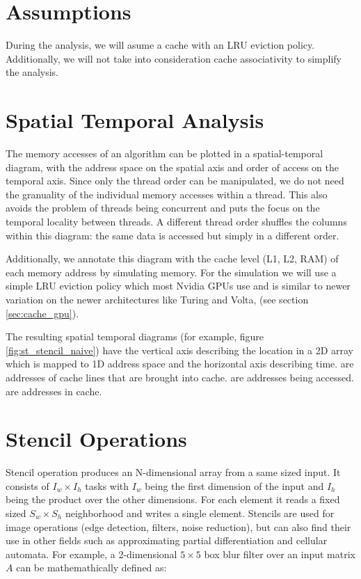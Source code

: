 \section{Assumptions}
During the analysis, we will asume a cache with an LRU eviction policy.
Additionally, we will not take into consideration cache associativity to simplify the analysis.

\section{Spatial Temporal Analysis}
\label{sec:st_analysis}
The memory accesses of an algorithm can be plotted in a spatial-temporal diagram, with the address space on the spatial axis and order of access on the temporal axis.
Since only the thread order can be manipulated, we do not need the granuality of the individual memory accesses within a thread.
This also avoids the problem of threads being concurrent and puts the focus on the temporal locality between threads.
A different thread order shuffles the columns within this diagram: the same data is accessed but simply in a different order.

Additionally, we annotate this diagram with the cache level (L1, L2, RAM) of each memory address by simulating memory.
For the simulation we will use a simple LRU eviction policy which most Nvidia GPUs use and is similar to newer variation on the newer architectures like Turing and Volta, (see section \ref{sec:cache_gpu}).

The resulting spatial temporal diagrams (for example, figure \ref{fig:st_stencil_naive}) have the vertical axis describing the location in a 2D array which is mapped to 1D address space and the horizontal axis describing time.  are addresses of cache lines that are brought into cache.  are addresses being accessed.  are addresses in cache.

\section{Stencil Operations}

Stencil operation produces an N-dimensional array from a same sized input.
It consists of $I_w \times I_h$ tasks with $I_w$ being the first dimension of the input and $I_h$ being the product over the other dimensions.
For each element it reads a fixed sized $S_w \times S_h$ neighborhood and writes a single element.
Stencils are used for image operations (edge detection, filters, noise reduction), but can also find their use in other fields such as approximating partial differentiation\cite{roth1997compilingstencils} and cellular automata.
For example, a 2-dimensional $5 \times 5$ box blur filter over an input matrix $A$ can be mathemathically defined as:

